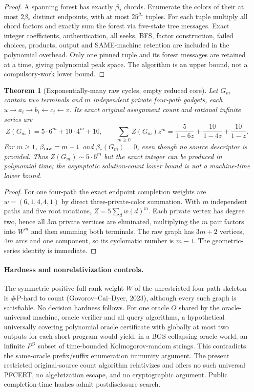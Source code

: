 \documentclass[11pt]{article}
\newtheorem{theorem}{Theorem}
\begin{document}
\begin{proof}
A spanning forest has exactly $\beta_*$ chords. Enumerate the colors of their at most $2\beta_*$ distinct endpoints, with at most $25^{\beta_*}$ tuples. For each tuple multiply all chord factors and exactly sum the forest via five-state tree messages. Exact integer coefficients, authentication, all seeks, BFS, factor construction, failed choices, products, output and SAME-machine retention are included in the polynomial overhead. Only one pinned tuple and its forest messages are retained at a time, giving polynomial peak space. The algorithm is an upper bound, not a compulsory-work lower bound.
\end{proof}
\begin{theorem}[Exponentially-many raw cycles, empty reduced core]
Let $G_m$ contain two terminals and $m$ independent private four-path gadgets, each $u\to a_i\to b_i\leftarrow c_i\leftarrow v$. Its exact original assignment count and rational infinite series are
\[\boxed{Z(G_m)=5\cdot6^m+10\cdot4^m+10,\qquad
\sum_{m\ge0}Z(G_m)z^m=\frac5{1-6z}+\frac{10}{1-4z}+\frac{10}{1-z}.}\]
For $m\ge1$, $\beta_{\rm raw}=m-1$ and $\beta_*(G_m)=0$, even though no source descriptor is provided. Thus $Z(G_m)\sim5\cdot6^m$ but the exact integer can be produced in polynomial time; the asymptotic solution-count lower bound is not a machine-time lower bound.
\end{theorem}
\begin{proof}
For one four-path the exact endpoint completion weights are $w=(6,1,4,4,1)$ by direct three-private-color summation. With $m$ independent paths and five root rotations, $Z=5\sum_d w(d)^m$. Each private vertex has degree two, hence all $3m$ private vertices are eliminated, multiplying the $m$ pair factors into $W^m$ and then summing both terminals. The raw graph has $3m+2$ vertices, $4m$ arcs and one component, so its cyclomatic number is $m-1$. The geometric-series identity is immediate.
\end{proof}
\paragraph{Hardness and nonrelativization controls.}
The symmetric positive full-rank weight $W$ of the unrestricted four-path skeleton is \#P-hard to count (Govorov--Cai--Dyer, 2023), although every such graph is satisfiable. No decision hardness follows. For one oracle $O$ shared by the oracle-universal machine, oracle verifier and all query algorithms, a hypothetical universally covering polynomial oracle certificate with globally at most two outputs for each short program would yield, in a BGS collapsing oracle world, an infinite $P^O$ subset of time-bounded Kolmogorov-random strings. This contradicts the same-oracle prefix/suffix enumeration immunity argument. The present restricted original-source count algorithm relativizes and offers no such universal PFCERT, no algebrization escape, and no cryptographic argument. Public completion-time hashes admit postdisclosure search.
\end{document}
